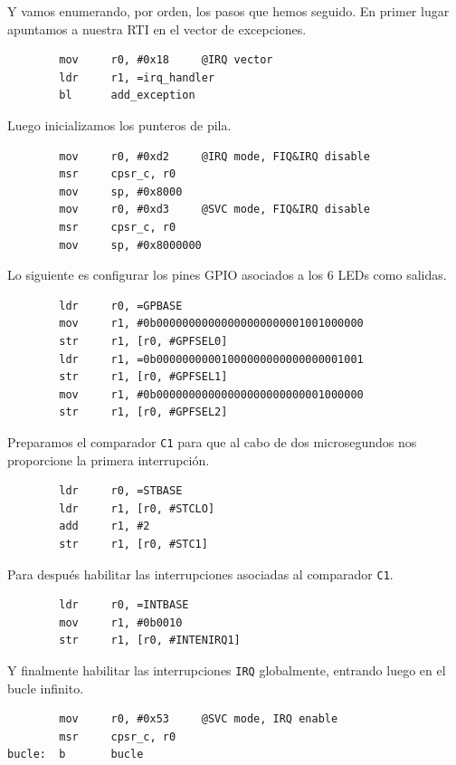 Y vamos enumerando, por orden, los pasos que hemos seguido. En primer lugar apuntamos a nuestra
RTI en el vector de excepciones.

\begin{lstlisting}
        mov     r0, #0x18     @IRQ vector
        ldr     r1, =irq_handler
        bl      add_exception
\end{lstlisting}

Luego inicializamos los punteros de pila.

\begin{lstlisting}
        mov     r0, #0xd2     @IRQ mode, FIQ&IRQ disable
        msr     cpsr_c, r0
        mov     sp, #0x8000
        mov     r0, #0xd3     @SVC mode, FIQ&IRQ disable
        msr     cpsr_c, r0
        mov     sp, #0x8000000
\end{lstlisting}

Lo siguiente es configurar los pines GPIO asociados a los 6 LEDs como salidas.

\begin{lstlisting}
        ldr     r0, =GPBASE
        mov     r1, #0b00000000000000000000001001000000
        str     r1, [r0, #GPFSEL0]
        ldr     r1, =0b00000000001000000000000000001001
        str     r1, [r0, #GPFSEL1]
        mov     r1, #0b00000000000000000000000001000000
        str     r1, [r0, #GPFSEL2]
\end{lstlisting}

Preparamos el comparador {\tt C1} para que al cabo de dos microsegundos nos proporcione la primera
interrupción.

\begin{lstlisting}
        ldr     r0, =STBASE
        ldr     r1, [r0, #STCLO]
        add     r1, #2
        str     r1, [r0, #STC1]
\end{lstlisting}

Para después habilitar las interrupciones asociadas al comparador {\tt C1}.

\begin{lstlisting}
        ldr     r0, =INTBASE
        mov     r1, #0b0010
        str     r1, [r0, #INTENIRQ1]
\end{lstlisting}

Y finalmente habilitar las interrupciones {\tt IRQ} globalmente, entrando luego en
el bucle infinito.

\begin{lstlisting}
        mov     r0, #0x53     @SVC mode, IRQ enable
        msr     cpsr_c, r0
bucle:  b       bucle
\end{lstlisting}

